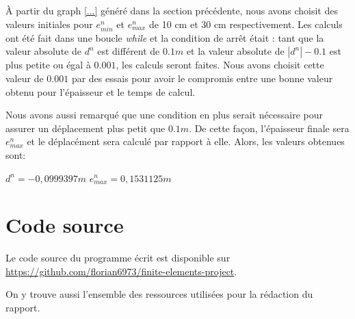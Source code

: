 \documentclass{article}
\begin{document}
   À partir du graph \ref{...} généré dans la section précédente, nous avons choisit des valeurs initiales pour $e^n_{min}$ et $e^n_{max}$ de 10 cm et 30 cm respectivement. Les calculs ont été fait dans une boucle \emph {while} et la condition de arrêt était : tant que la valeur absolute de $d^n$ est différent de $0.1 m$ et la valeur absolute de $|d^n|-0.1$ est plus petite ou égal à $0.001$, les calculs seront faites. Nous avons choisit cette valeur de $0.001$ par des essais pour avoir le compromis entre une bonne valeur obtenu pour l'épaisseur et le temps de calcul.
    
    Nous avons aussi remarqué que une condition en plus serait nécessaire pour assurer un déplacement plus petit que $ 0.1 m$. De cette façon, l'épaisseur finale sera $e^n_{max}$ et le déplacément sera calculé par rapport à elle. Alors, les valeurs obtenues sont:

    \begin{center}
    $d^n = - 0,0999397 m$
    $e^n_{max} = 0,1531125 m$
    \end{center}
    
    \clearpage
    \appendix
    \section {Code source}

    Le code source du programme écrit est disponible sur \url{https://github.com/florian6973/finite-elements-project}.

    On y trouve aussi l'ensemble des ressources utilisées pour la rédaction du rapport.



    
\end{document}
